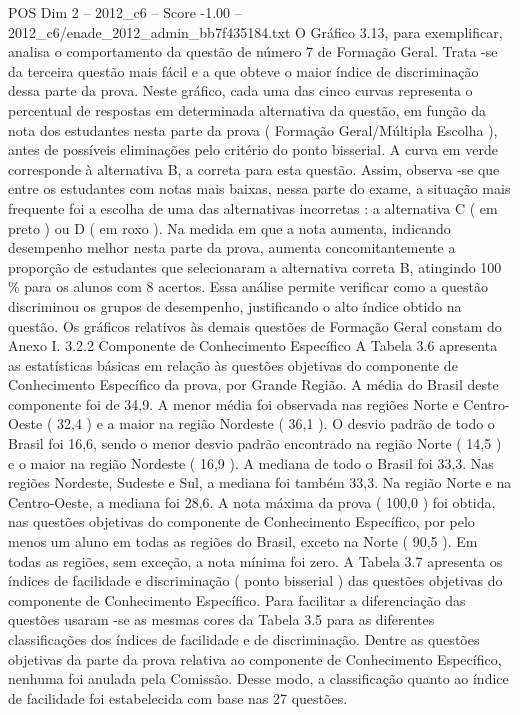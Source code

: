 \begin{textsample}{POS Dim 2 – 2012\_c6 – Score -1.00 – 2012\_c6/enade\_2012\_admin\_bb7f435184.txt}
O Gráfico 3.13, para exemplificar, analisa o comportamento da questão de número 7 de Formação Geral.
Trata -se da terceira questão mais fácil e a que obteve o maior índice de discriminação dessa parte da prova.
Neste gráfico, cada uma das cinco curvas representa o percentual de respostas em determinada alternativa da questão, em função da nota dos estudantes nesta parte da prova ( Formação Geral/Múltipla Escolha ), antes de possíveis eliminações pelo critério do ponto bisserial.
A curva em verde corresponde à alternativa B, a correta para esta questão.
Assim, observa -se que entre os estudantes com notas mais baixas, nessa parte do exame, a situação mais frequente foi a escolha de uma das alternativas incorretas : a alternativa C ( em preto ) ou D ( em roxo ).
Na medida em que a nota aumenta, indicando desempenho melhor nesta parte da prova, aumenta concomitantemente a proporção de estudantes que selecionaram a alternativa correta B, atingindo 100 \% para os alunos com 8 acertos.
Essa análise permite verificar como a questão discriminou os grupos de desempenho, justificando o alto índice obtido na questão.
Os gráficos relativos às demais questões de Formação Geral constam do Anexo I. 3.2.2 Componente de Conhecimento Específico A Tabela 3.6 apresenta as estatísticas básicas em relação às questões objetivas do componente de Conhecimento Específico da prova, por Grande Região.
A média do Brasil deste componente foi de 34,9.
A menor média foi observada nas regiões Norte e Centro-Oeste ( 32,4 ) e a maior na região Nordeste ( 36,1 ).
O desvio padrão de todo o Brasil foi 16,6, sendo o menor desvio padrão encontrado na região Norte ( 14,5 ) e o maior na região Nordeste ( 16,9 ).
A mediana de todo o Brasil foi 33,3.
Nas regiões Nordeste, Sudeste e Sul, a mediana foi também 33,3.
Na região Norte e na Centro-Oeste, a mediana foi 28,6.
A nota máxima da prova ( 100,0 ) foi obtida, nas questões objetivas do componente de Conhecimento Específico, por pelo menos um aluno em todas as regiões do Brasil, exceto na Norte ( 90,5 ).
Em todas as regiões, sem exceção, a nota mínima foi zero.
A Tabela 3.7 apresenta os índices de facilidade e discriminação ( ponto bisserial ) das questões objetivas do componente de Conhecimento Específico.
Para facilitar a diferenciação das questões usaram -se as mesmas cores da Tabela 3.5 para as diferentes classificações dos índices de facilidade e de discriminação.
Dentre as questões objetivas da parte da prova relativa ao componente de Conhecimento Específico, nenhuma foi anulada pela Comissão.
Desse modo, a classificação quanto ao índice de facilidade foi estabelecida com base nas 27 questões.

\end{textsample}
